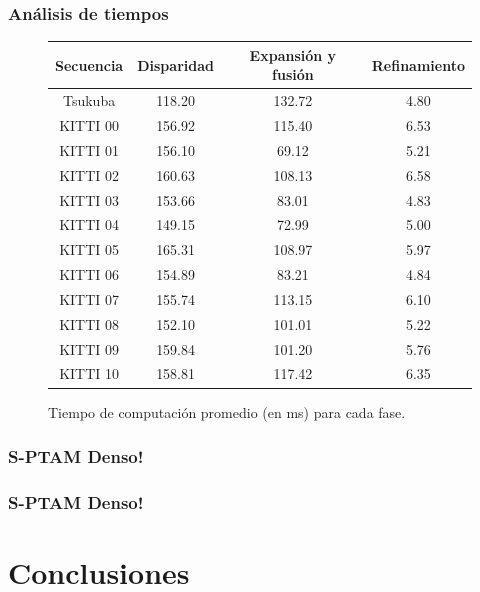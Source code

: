 \documentclass[compress]{beamer}
\begin{document}
\begin{frame}
	\frametitle{Análisis de tiempos}
	\vspace{-0.7em}
	\begin{center}
	\begin{figure}[tbh]
	\begin{centering}
	\begin{tabular}{cccc}
		\toprule 
		Secuencia & Disparidad & Expansión y fusión & Refinamiento\tabularnewline
		\midrule
		\midrule 
		Tsukuba & 118.20 & 132.72 & 4.80\tabularnewline
		\midrule 
		KITTI 00 & 156.92 & 115.40 & 6.53\tabularnewline
		\midrule 
		KITTI 01 & 156.10 & 69.12 & 5.21\tabularnewline
		\midrule 
		KITTI 02 & 160.63 & 108.13 & 6.58\tabularnewline
		\midrule 
		KITTI 03 & 153.66 & 83.01 & 4.83\tabularnewline
		\midrule 
		KITTI 04 & 149.15 & 72.99 & 5.00\tabularnewline
		\midrule 
		KITTI 05 & 165.31 & 108.97 & 5.97\tabularnewline
		\midrule 
		KITTI 06 & 154.89 & 83.21 & 4.84\tabularnewline
		\midrule 
		KITTI 07 & 155.74 & 113.15 & 6.10\tabularnewline
		\midrule 
		KITTI 08 & 152.10 & 101.01 & 5.22\tabularnewline
		\midrule 
		KITTI 09 & 159.84 & 101.20 & 5.76\tabularnewline
		\midrule 
		KITTI 10 & 158.81 & 117.42 & 6.35\tabularnewline
		\bottomrule
	\end{tabular}
	\par\end{centering}
	\centering
	\caption{Tiempo de computación promedio (en ms) para cada fase.}
	\end{figure}
	\par\end{center}
\end{frame}

\begin{frame}
	\frametitle{S-PTAM Denso!}
	\centering
	
\end{frame}

\begin{frame}
	\frametitle{S-PTAM Denso!}
	\centering
	
\end{frame}


\section{Conclusiones}
\end{document}

